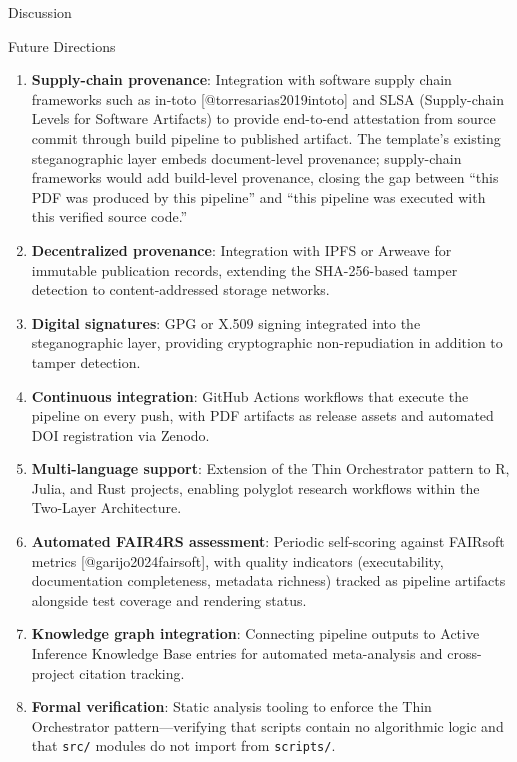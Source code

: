 \documentclass[
  ignorenonframetext,
]{beamer}
\providecommand{\tightlist}{%
  \setlength{\itemsep}{0pt}\setlength{\parskip}{0pt}}
\begin{document}
\begin{frame}[fragile]{Discussion}
\begin{block}{Future Directions}
\protect{}\label{future-directions}
\begin{enumerate}
\tightlist
\item
  \textbf{Supply-chain provenance}: Integration with software supply
  chain frameworks such as in-toto {[}@torresarias2019intoto{]} and SLSA
  (Supply-chain Levels for Software Artifacts) to provide end-to-end
  attestation from source commit through build pipeline to published
  artifact. The template's existing steganographic layer embeds
  document-level provenance; supply-chain frameworks would add
  build-level provenance, closing the gap between ``this PDF was
  produced by this pipeline'' and ``this pipeline was executed with this
  verified source code.''
\item
  \textbf{Decentralized provenance}: Integration with IPFS or Arweave
  for immutable publication records, extending the SHA-256-based tamper
  detection to content-addressed storage networks.
\item
  \textbf{Digital signatures}: GPG or X.509 signing integrated into the
  steganographic layer, providing cryptographic non-repudiation in
  addition to tamper detection.
\item
  \textbf{Continuous integration}: GitHub Actions workflows that execute
  the pipeline on every push, with PDF artifacts as release assets and
  automated DOI registration via Zenodo.
\item
  \textbf{Multi-language support}: Extension of the Thin Orchestrator
  pattern to R, Julia, and Rust projects, enabling polyglot research
  workflows within the Two-Layer Architecture.
\item
  \textbf{Automated FAIR4RS assessment}: Periodic self-scoring against
  FAIRsoft metrics {[}@garijo2024fairsoft{]}, with quality indicators
  (executability, documentation completeness, metadata richness) tracked
  as pipeline artifacts alongside test coverage and rendering status.
\item
  \textbf{Knowledge graph integration}: Connecting pipeline outputs to
  Active Inference Knowledge Base entries for automated meta-analysis
  and cross-project citation tracking.
\item
  \textbf{Formal verification}: Static analysis tooling to enforce the
  Thin Orchestrator pattern---verifying that scripts contain no
  algorithmic logic and that \texttt{src/} modules do not import from
  \texttt{scripts/}.
\end{enumerate}
\end{block}
\end{frame}
\end{document}
